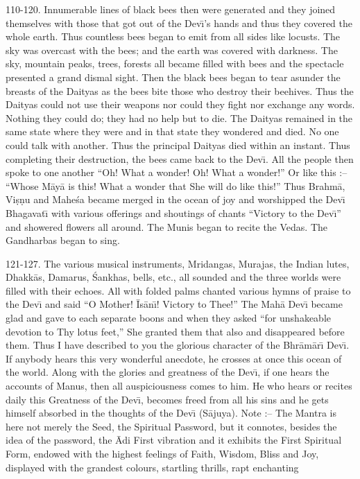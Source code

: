 110-120. Innumerable lines of black bees then were generated and they joined themselves with those that got out of the Dev\={\i}'s hands and thus they covered the whole earth. Thus countless bees began to emit from all sides like locusts. The sky was overcast with the bees; and the earth was covered with darkness. The sky, mountain peaks, trees, forests all became filled with bees and the spectacle presented a grand dismal sight. Then the black bees began to tear asunder the breasts of the Daityas as the bees bite those who destroy their beehives. Thus the Daityas could not use their weapons nor could they fight nor exchange any words. Nothing they could do; they had no help but to die. The Daityas remained in the same state where they were and in that state they wondered and died. No one could talk with another. Thus the principal Daityas died within an instant. Thus completing their destruction, the bees came back to the Dev\={\i}. All the people then spoke to one another ``Oh! What a wonder! Oh! What a wonder!'' Or like this :-- ``Whose M\=ay\=a is this! What a wonder that She will do like this!'' Thus Brahm\=a, Vi\d{s}\d{n}u and Mahe\'sa became merged in the ocean of joy and worshipped the Dev\={\i} Bhagavat\={\i} with various offerings and shoutings of chants ``Victory to the Dev\={\i}'' and showered flowers all around. The Munis began to recite the Vedas. The Gandharbas began to sing.

121-127. The various musical instruments, Mridangas, Murajas, the Indian lutes, Dhakk\=as, Damarus, \'Sankhas, bells, etc., all sounded and the three worlds were filled with their echoes. All with folded palms chanted various hymns of praise to the Dev\={\i} and said ``O Mother! \=Is\=an\={\i}! Victory to Thee!'' The Mah\=a Dev\={\i} became glad and gave to each separate boons and when they asked ``for unshakeable devotion to Thy lotus feet,'' She granted them that also and disappeared before them. Thus I have described to you the glorious character of the Bhr\=am\=ar\={\i} Dev\={\i}. If anybody hears this very wonderful anecdote, he crosses at once this ocean of the world. Along with the glories and greatness of the Dev\={\i}, if one hears the accounts of Manus, then all auspiciousness comes to him. He who hears or recites daily this Greatness of the Dev\={\i}, becomes freed from all his sins and he gets himself absorbed in the thoughts of the Dev\={\i} (S\=ajuya). Note :-- The Mantra is here not merely the Seed, the Spiritual Password, but it connotes, besides the idea of the password, the \=Adi First vibration and it exhibits the First Spiritual Form, endowed with the highest feelings of Faith, Wisdom, Bliss and Joy, displayed with the grandest colours, startling thrills, rapt enchanting

